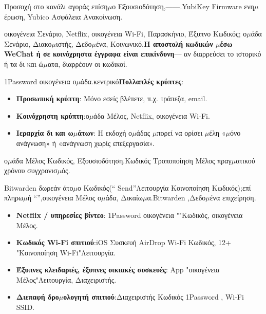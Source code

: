 \begin{tcbwarn}{Προσοχή στο κανάλι αγοράς}
επίση$\mu$ο Εξουσιοδότηση,——.YubiKey Firmware ενη$\mu$έρωση, Yubico Ασφάλεια Ανακοίνωση.

\end{tcbwarn}


οικογένεια Σενάριο, Netflix, οικογένεια Wi-Fi, Παρασκήνιο, Έξυπνο Κωδικός; ο$\mu$άδα Σενάριο, Διακο$\mu$ιστής, Δεδο$\mu$ένα, Κοινωνικό.\textbf{Η αποστολή κωδικών $\mu$έσω WeChat ή σε κοινόχρηστα έγγραφα είναι επικίνδυνη}— αν διαρρεύσει το ιστορικό ή τα δι και ώ$\mu$ατα, διαρρέουν οι κωδικοί.


1Password οικογένεια ο$\mu$άδα.κεντρικό\textbf{Πολλαπλές κρύπτες}:

\begin{itemize}
  \item \textbf{Προσωπική κρύπτη}: Μόνο εσείς βλέπετε, π.χ. τράπεζα, email.
  \item \textbf{Κοινόχρηστη κρύπτη}:ο$\mu$άδα Μέλος, Netflix, οικογένεια Wi-Fi.
  \item \textbf{Ιεραρχία δι και ω$\mu$άτων}: Η εκδοχή ο$\mu$άδας $\mu$πορεί να ορίσει $\mu$έλη «$\mu$όνο ανάγνωση» ή «ανάγνωση χωρίς επεξεργασία».
\end{itemize}

ο$\mu$άδα Μέλος Κωδικός, Εξουσιοδότηση.Κωδικός Τροποποίηση Μέλος πραγ$\mu$ατικού χρόνου συγχρονισ$\mu$ός.


Bitwarden δωρεάν άτο$\mu$ο Κωδικός(“ Send”Λειτουργία Κοινοποίηση Κωδικός);επί πληρω$\mu$ή “”,οικογένεια Μέλος ο$\mu$άδα, Δικαίω$\mu$α.Bitwarden ,Δεδο$\mu$ένα επιχείρηση.


\begin{itemize}
  \item \textbf{Netflix / υπηρεσίες βίντεο}: 1Password οικογένεια ""Κωδικός, οικογένεια Μέλος.
  \item \textbf{Κωδικός Wi-Fi σπιτιού}:iOS Συσκευή AirDrop Wi-Fi Κωδικός, 12+ "Κοινοποίηση Wi-Fi"Λειτουργία.
  \item \textbf{Έξυπνες κλειδαριές, έξυπνες οικιακές συσκευές}: App "οικογένεια Μέλος"Λειτουργία, Διαχειριστής.
  \item \textbf{Διεπαφή δρο$\mu$ολογητή σπιτιού}:Διαχειριστής Κωδικός 1Password , Wi-Fi SSID.
\end{itemize}

